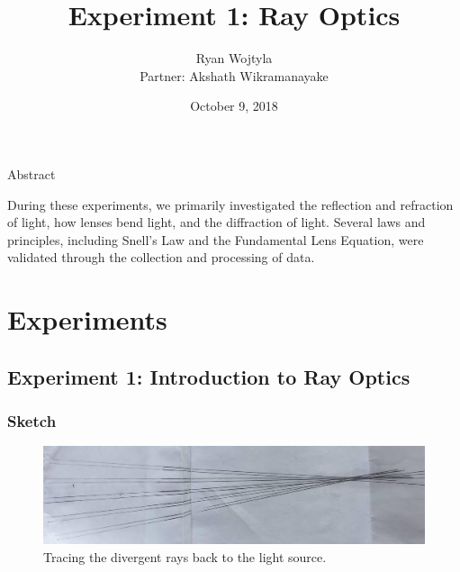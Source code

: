 \documentclass[12pt]{article}
\begin{document}

\begin{titlepage}

  \title{Experiment 1: Ray Optics}
  \author{Ryan Wojtyla \\
          Partner: Akshath Wikramanayake \\}
  \date{October 9, 2018}

\maketitle

\begin{center}
  Abstract
\end{center}

\qq During these experiments, we primarily investigated the reflection and
refraction of light, how lenses bend light, and the diffraction of
light. Several laws and principles, including Snell's Law and the Fundamental
Lens Equation, were validated through the collection and processing of data.

\thispagestyle{empty}

\end{titlepage}



\section{Experiments}


\subsection{Experiment 1: Introduction to Ray Optics}

\subsubsection{Sketch}

\begin{figure}[H]
  \label{pic:exp1}
  \begin{center}
    \includegraphics[scale=0.3]{exp1.jpg}
  \end{center}
  \caption{Tracing the divergent rays back to the light source.}
\end{figure}
\end{document}

